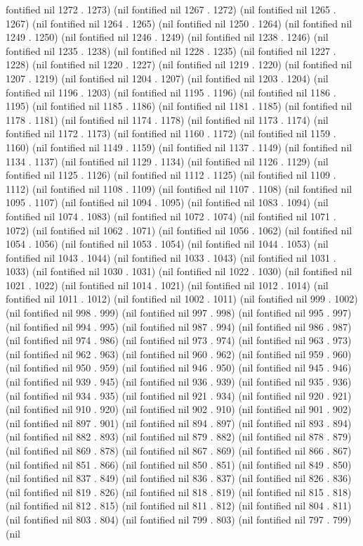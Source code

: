 fontified nil 1272 . 1273) (nil fontified nil 1267 . 1272) (nil fontified nil 1265 . 1267) (nil fontified nil 1264 . 1265) (nil fontified nil 1250 . 1264) (nil fontified nil 1249 . 1250) (nil fontified nil 1246 . 1249) (nil fontified nil 1238 . 1246) (nil fontified nil 1235 . 1238) (nil fontified nil 1228 . 1235) (nil fontified nil 1227 . 1228) (nil fontified nil 1220 . 1227) (nil fontified nil 1219 . 1220) (nil fontified nil 1207 . 1219) (nil fontified nil 1204 . 1207) (nil fontified nil 1203 . 1204) (nil fontified nil 1196 . 1203) (nil fontified nil 1195 . 1196) (nil fontified nil 1186 . 1195) (nil fontified nil 1185 . 1186) (nil fontified nil 1181 . 1185) (nil fontified nil 1178 . 1181) (nil fontified nil 1174 . 1178) (nil fontified nil 1173 . 1174) (nil fontified nil 1172 . 1173) (nil fontified nil 1160 . 1172) (nil fontified nil 1159 . 1160) (nil fontified nil 1149 . 1159) (nil fontified nil 1137 . 1149) (nil fontified nil 1134 . 1137) (nil fontified nil 1129 . 1134) (nil fontified nil 1126 . 1129) (nil fontified nil 1125 . 1126) (nil fontified nil 1112 . 1125) (nil fontified nil 1109 . 1112) (nil fontified nil 1108 . 1109) (nil fontified nil 1107 . 1108) (nil fontified nil 1095 . 1107) (nil fontified nil 1094 . 1095) (nil fontified nil 1083 . 1094) (nil fontified nil 1074 . 1083) (nil fontified nil 1072 . 1074) (nil fontified nil 1071 . 1072) (nil fontified nil 1062 . 1071) (nil fontified nil 1056 . 1062) (nil fontified nil 1054 . 1056) (nil fontified nil 1053 . 1054) (nil fontified nil 1044 . 1053) (nil fontified nil 1043 . 1044) (nil fontified nil 1033 . 1043) (nil fontified nil 1031 . 1033) (nil fontified nil 1030 . 1031) (nil fontified nil 1022 . 1030) (nil fontified nil 1021 . 1022) (nil fontified nil 1014 . 1021) (nil fontified nil 1012 . 1014) (nil fontified nil 1011 . 1012) (nil fontified nil 1002 . 1011) (nil fontified nil 999 . 1002) (nil fontified nil 998 . 999) (nil fontified nil 997 . 998) (nil fontified nil 995 . 997) (nil fontified nil 994 . 995) (nil fontified nil 987 . 994) (nil fontified nil 986 . 987) (nil fontified nil 974 . 986) (nil fontified nil 973 . 974) (nil fontified nil 963 . 973) (nil fontified nil 962 . 963) (nil fontified nil 960 . 962) (nil fontified nil 959 . 960) (nil fontified nil 950 . 959) (nil fontified nil 946 . 950) (nil fontified nil 945 . 946) (nil fontified nil 939 . 945) (nil fontified nil 936 . 939) (nil fontified nil 935 . 936) (nil fontified nil 934 . 935) (nil fontified nil 921 . 934) (nil fontified nil 920 . 921) (nil fontified nil 910 . 920) (nil fontified nil 902 . 910) (nil fontified nil 901 . 902) (nil fontified nil 897 . 901) (nil fontified nil 894 . 897) (nil fontified nil 893 . 894) (nil fontified nil 882 . 893) (nil fontified nil 879 . 882) (nil fontified nil 878 . 879) (nil fontified nil 869 . 878) (nil fontified nil 867 . 869) (nil fontified nil 866 . 867) (nil fontified nil 851 . 866) (nil fontified nil 850 . 851) (nil fontified nil 849 . 850) (nil fontified nil 837 . 849) (nil fontified nil 836 . 837) (nil fontified nil 826 . 836) (nil fontified nil 819 . 826) (nil fontified nil 818 . 819) (nil fontified nil 815 . 818) (nil fontified nil 812 . 815) (nil fontified nil 811 . 812) (nil fontified nil 804 . 811) (nil fontified nil 803 . 804) (nil fontified nil 799 . 803) (nil fontified nil 797 . 799) (nil 